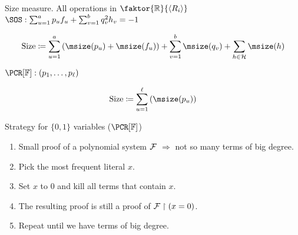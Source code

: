 \begin{frame}{Size measure. All operations in $\faktor{\mathbb{R}}{\langle R_i \rangle}$}
    \pause
    $\SOS: \sum_{u = 1}^{a} p_u f_u + \sum_{v = 1}^{b} q_v^2 h_v = -1$

    $$
    \text{Size} \coloneqq \sum_{u = 1}^{a} \left( \msize(p_u) + \msize(f_u) \right) +
    \sum_{v = 1}^{b} \msize(q_v) + \sum_{h \in \Hs} \msize(h)
    $$
        
    \vspace{1cm}
    $\PCR[\field]: (p_1, \dots, p_{\ell})$
    
    $$
    \text{Size} \coloneqq \sum_{u = 1}^{\ell} \left( \msize(p_u) \right)
    $$
\end{frame}


\begin{frame}{Strategy for $\{0, 1\}$ variables ($\PCR[\field]$)}
    \pause

    \begin{enumerate}
        \item Small proof of a polynomial system $\mathcal{F}$ $\Rightarrow$ not so many terms of big degree.
        \pause
        \item Pick the most frequent literal $x$.
            \pause
        \item Set $x$ to $0$ and kill all terms that contain $x$.
            \pause
        \item The resulting proof is still a proof of $\mathcal{F} \upharpoonright (x = 0)$.
            \pause
        \item Repeat until we have terms of big degree.
    \end{enumerate}
\end{frame}